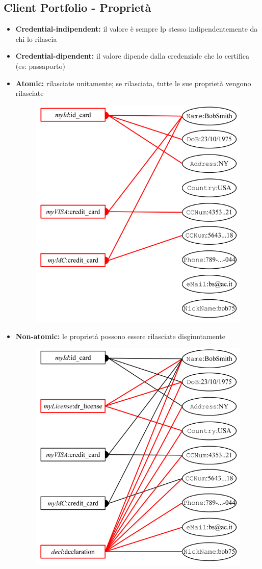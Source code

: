 \documentclass{report}
\begin{document}
\subsection{Client Portfolio - Proprietà}
\begin{itemize}
    \item \textbf{Credential-indipendent:} il valore è sempre lp stesso indipendentemente da chi lo rilascia
    \item \textbf{Credential-dipendent:} il valore dipende dalla credenziale che lo certifica (es: passaporto)
    \item \textbf{Atomic:} rilasciate unitamente; se rilasciata, tutte le sue proprietà vengono rilasciate 
    \begin{figure}[ht]
    \centering
    \includegraphics[width=0.6\linewidth]{images/ atomic.png}
    \end{figure}
    \item \textbf{Non-atomic:} le proprietà possono essere rilasciate disgiuntamente 
    \begin{figure}[ht]
        \centering
        \includegraphics[width=0.6\linewidth]{images/non-atomi.png}
    \end{figure}
\end{itemize}
\end{document}
